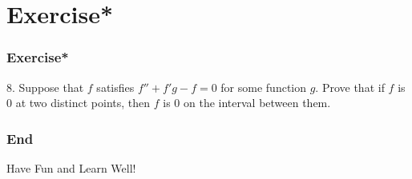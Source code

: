 \documentclass[12pt, t]{beamer}
\begin{document}
\section{Exercise*}
\begin{frame}
    \frametitle{Exercise*}
    8. Suppose that $f$ satisfies $f''+f'g-f=0$ for some function $g$. Prove that if $f$ is 0 at two distinct points,
    then $f$ is 0 on the interval between them.
\end{frame}


\begin{frame}
    \frametitle{End}
    \vspace{2cm}
    \Huge \center  Have Fun and Learn Well!
\end{frame}
\end{document}

